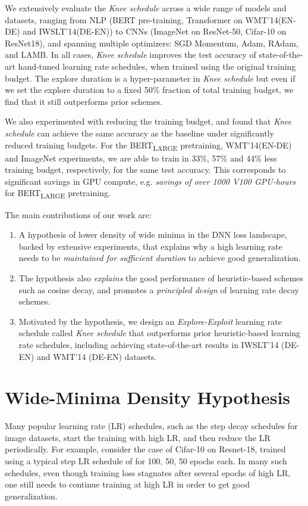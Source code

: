 \documentclass{article} \usepackage{iclr2021_conference,times}
\newcommand{\lrschedule}{\textit{Knee schedule}}
\begin{document}
We extensively evaluate the \lrschedule{} across a wide range of models and datasets, ranging from NLP (BERT pre-training, Transformer on WMT'14(EN-DE) and IWSLT'14(DE-EN)) to CNNs (ImageNet on ResNet-50, Cifar-10 on ResNet18), and spanning multiple optimizers: SGD Momentum, Adam, RAdam,  and LAMB.  In all cases, \lrschedule{} improves the test accuracy of state-of-the-art hand-tuned learning rate schedules, when trained using the original training budget. The explore duration is a hyper-parameter in \lrschedule{} but even if we set the explore duration to a fixed 50\% fraction of total training budget, we find that it still outperforms prior schemes.

We also experimented with reducing the training budget, and found that \lrschedule{} can achieve the same accuracy as the baseline under significantly reduced training budgets. For the BERT\textsubscript{LARGE} pretraining, WMT'14(EN-DE) and ImageNet experiments, we are able to train in 33\%, 57\% and 44\% less training budget, respectively, for the same test accuracy. This corresponds to significant savings in GPU compute, e.g. \textit{savings of over 1000 V100 GPU-hours} for BERT\textsubscript{LARGE} pretraining.


The main contributions of our work are:
\begin{enumerate}[nosep]
 \item A hypothesis of lower density of wide minima in the DNN loss landscape, backed by extensive experiments, that explains why a high learning rate needs to be {\it maintained for sufficient duration} to achieve good generalization.
  \item The hypothesis also  {\it explains} the good performance of heuristic-based schemes such as cosine decay,  and promotes a {\it principled design} of learning rate decay schemes.
 \item Motivated by the hypothesis, we design an {\it Explore-Exploit} learning rate schedule called \lrschedule{} that outperforms prior heuristic-based learning rate schedules, including achieving state-of-the-art results in 
 IWSLT’14 (DE-EN) and WMT’14 (DE-EN) datasets.
\end{enumerate}
\vspace{-4pt} \section{Wide-Minima Density Hypothesis}
\label{sec:wide_minima_hypothesis}

Many popular learning rate (LR) schedules, such as the step decay schedules for image datasets, start the training with high LR, and then reduce the LR periodically. For example, consider the case of Cifar-10 on Resnet-18, trained using a typical step LR schedule of  for 100, 50, 50 epochs each. In many such schedules, even though training loss stagnates after several epochs of high LR, one still needs to continue training at high LR in order to get good generalization. 
\end{document}
